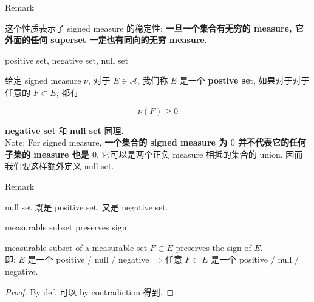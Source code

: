\documentclass{qlnotes-export}
\begin{document}
\begin{qlremark}{Remark}

这个性质表示了 signed measure 的稳定性: \textbf{一旦一个集合有无穷的 measure, 它外面的任何 superset 一定也有同向的无穷 measure}.

\end{qlremark}

\begin{definition}{positive set, negative set, null set}\label{def-10-signed-measure-jordan-decomposition-positive-set-negative-set-null-set}

给定 signed measure \(\nu\), 对于 \(E \in \mathcal{A}\), 我们称 \(E\) 是一个 \textbf{postive se}t, 如果对于对于任意的 \(F \subset E\), 都有

\[\nu(F) \geq 0\]

\textbf{negative set} 和 \textbf{null set} 同理.\\
Note: For signed measure, \textbf{一个集合的 signed measure 为 \(0\) 并不代表它的任何子集的 measure 也是 \(0\)}, 它可以是两个正负 measure 相抵的集合的 union. 因而我们要这样额外定义 null set.

\end{definition}

\begin{qlremark}{Remark}

null set 既是 positive set, 又是 negative set.

\end{qlremark}

\begin{lemma}{measurable subset preserves sign}\label{lem-10-signed-measure-jordan-decomposition-measurable-subset-preserves-sign}

measurable subset of a measurable set \(F \subset E\) preserves the sign of \(E\).\\
即: \(E\) 是一个 positive / null / negative \(\Longrightarrow\)任意 \(F \subset E\) 是一个 positive / null / negative.

\end{lemma}

\begin{proof}

By def, 可以 by contradiction 得到.

\end{proof}
\end{document}
